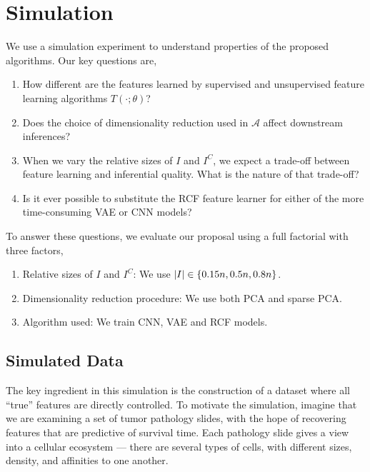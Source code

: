 
\section{Simulation}
\label{sec:simulation}

We use a simulation experiment to understand properties of the proposed
algorithms. Our key questions are,

\begin{enumerate}
\item How different are the features learned by supervised and unsupervised
  feature learning algorithms $T\left(\cdot; \theta\right)$?
\item Does the choice of dimensionality reduction used in $\mathcal{A}$ affect
  downstream inferences?
\item When we vary the relative sizes of $I$ and $I^{C}$, we expect a trade-off
  between feature learning and inferential quality. What is the nature of that
  trade-off?
\item Is it ever possible to substitute the RCF feature learner for either of
  the more time-consuming VAE or CNN models?
\end{enumerate}

To answer these questions, we evaluate our proposal using a full factorial with
three factors,

\begin{enumerate}
\item Relative sizes of $I$ and $I^{C}$: We use $\left|I\right| \in \left\{0.15n, 0.5n, 0.8n\right\}$.
\item Dimensionality reduction procedure: We use both PCA and sparse PCA.
\item Algorithm used: We train CNN, VAE and RCF models.
\end{enumerate}

\subsection{Simulated Data}

The key ingredient in this simulation is the construction of a dataset where all
``true'' features are directly controlled. To motivate the simulation, imagine
that we are examining a set of tumor pathology slides, with the hope of
recovering features that are predictive of survival time. Each pathology slide
gives a view into a cellular ecosystem — there are several types of cells, with
different sizes, density, and affinities to one another.

